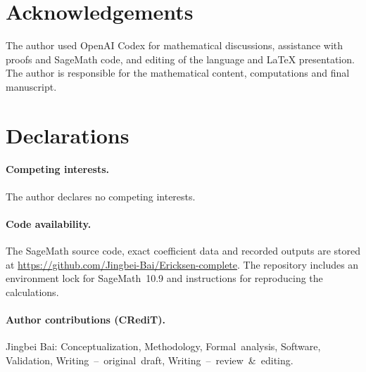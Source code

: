 \documentclass[11pt,a4paper]{article}
\numberwithin{equation}{section}
\theoremstyle{plain}
\theoremstyle{definition}
\theoremstyle{remark}
\begin{document}


\section*{Acknowledgements}

The author used OpenAI Codex for mathematical discussions, assistance
with proofs and SageMath code, and editing of the language and LaTeX
presentation. The author is responsible for the mathematical content,
computations and final manuscript.

\section*{Declarations}

\paragraph{Competing interests.}
The author declares no competing interests.

\paragraph{Code availability.}
The SageMath source code, exact coefficient data and recorded outputs
are stored at \url{https://github.com/Jingbei-Bai/Ericksen-complete}.
The repository includes an environment lock for SageMath~10.9 and
instructions for reproducing the calculations.

\paragraph{Author contributions (CRediT).}
Jingbei Bai: Conceptualization, Methodology, \mbox{Formal analysis}, Software,
Validation, \mbox{Writing -- original draft},
\mbox{Writing -- review \& editing}.
\end{document}
